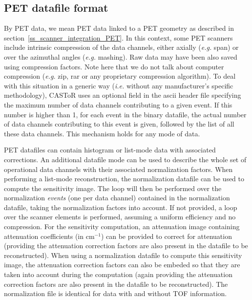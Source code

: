 \documentclass[a4paper, 11pt]{article}
\begin{document}
\subsection{PET datafile format}
\label{ss_input_PET}

By PET data, we mean PET data linked to a PET geometry as described in section~\ref{ss_scanner_integration_PET}. In this context, some PET scanners
include intrinsic compression of the data channels, either axially (\textit{e.g.} span) or over the azimuthal angles (\textit{e.g.} mashing). Raw data
may have been also saved using compression factors. Note here that we do not talk about computer compression (\textit{e.g.} zip, rar or any proprietary
compression algorithm). To deal with this situation in a generic way (\textit{i.e.} without any manufacturer's specific methodology), CASToR uses
an optional field in the ascii header file specifying the maximum number of data channels contributing to a given event. If this number is
higher than 1, for each event in the binary datafile, the actual number of data channels contributing to this event is given, followed by the
list of all these data channels. This mechanism holds for any mode of data.

PET datafiles can contain histogram or list-mode data with associated corrections. An additional datafile mode can be used to describe the whole set of
operational data channels with their associated normalization factors. When performing a list-mode reconstruction, the normalization datafile can be
used to compute the sensitivity image. The loop will then be performed over the normalization \textit{events} (one per data channel) contained in the
normalization datafile, taking the normalization factors into account. If not provided, a loop over the scanner elements is performed, assuming a
uniform efficiency and no compression. For the sensitivity computation, an attenuation image containing attenuation coefficients (in cm$^{-1}$) can be
provided to correct for attenuation (providing the attenuation correction factors are also present in the datafile to be reconstructed). When using
a normalization datafile to compute this sensitivity image, the attenuation correction factors can also be embeded so that they are taken into
account during the computation (again providing the attenuation correction factors are also present in the datafile to be reconstructed). The normalization file is identical for data with and without TOF information.
\end{document}
